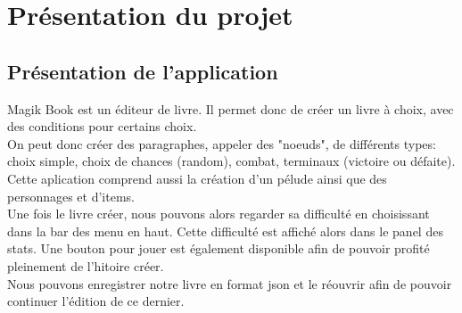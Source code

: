 \chapter{Présentation du projet}

	\section{Présentation de l'application}
        Magik Book est un éditeur de livre. Il permet donc de créer un livre à choix, avec des conditions pour certains choix.\\
        On peut donc créer des paragraphes, appeler des "noeuds", de différents types: choix simple, choix de chances (random), combat, terminaux (victoire ou défaite). Cette aplication comprend aussi la création d'un pélude ainsi que des personnages et d'items.\\
        Une fois le livre créer, nous pouvons alors regarder sa difficulté en choisissant dans la bar des menu en haut. Cette difficulté est affiché alors dans le panel des stats. Une bouton pour jouer est également disponible afin de pouvoir profité pleinement de l'hitoire créer.\\
        Nous pouvons enregistrer notre livre en format json et le réouvrir afin de pouvoir continuer l'édition de ce dernier.
